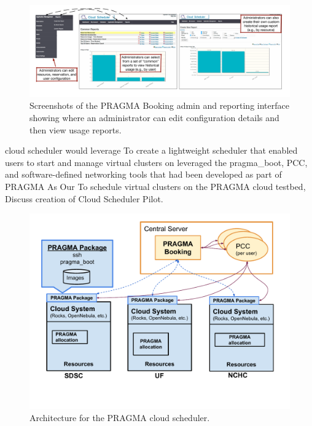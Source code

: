 \documentclass{acm_proc_article-sp}
\begin{document}
\begin{figure}[htbp]
\begin{center}
\includegraphics[width=\textwidth]{figures/bookedReportScreenshot.pdf}
\caption{Screenshots of the PRAGMA Booking admin and reporting interface showing where an administrator can edit configuration details and then view usage reports.}
\label{Fig:Reports}
\end{center}
\end{figure}


cloud scheduler would leverage 
To create a lightweight scheduler that enabled users to start and manage virtual clusters on leveraged the pragma\_boot, PCC, and software-defined networking tools that had been developed as part of PRAGMA 
As 
Our 
To schedule virtual clusters on the PRAGMA cloud testbed, 
Discuss creation of Cloud Scheduler Pilot.

\begin{figure}[htbp]
\begin{center}
\includegraphics[width=\columnwidth]{figures/arch.pdf}
\caption{Architecture for the PRAGMA cloud scheduler.}
\label{Fig:Arch}
\end{center}
\end{figure}
\end{document}
